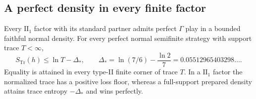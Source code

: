\subsection{A perfect density in every finite factor}
\begin{theorem}\label{thm:type-two}
Every $\mathrm{II}_1$ factor with its standard partner admits perfect $\Gamma$ play in a bounded faithful normal density. For every perfect normal semifinite strategy with support trace $T<\infty$,
\[
 S_{\operatorname{Tr}}(h)\le\ln T-\Delta_* ,\qquad
 \Delta_*=\ln(7/6)-\frac{\ln2}{7}=0.05512965403298\ldots.
\]
Equality is attained in every type-II finite corner of trace $T$. In a $\mathrm{II}_1$ factor the normalized trace has a positive loss floor, whereas a full-support prepared density attains trace entropy $-\Delta_*$ and wins perfectly.
\end{theorem}
